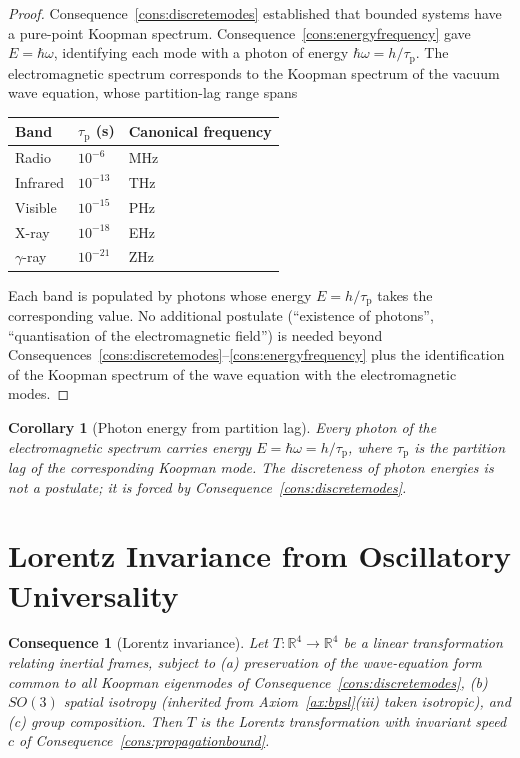 \documentclass[11pt,twocolumn,a4paper]{article}
\theoremstyle{axiomstyle}
\theoremstyle{conseqstyle}
\newtheorem{consequence}{Consequence}
\newtheorem{corollary}{Corollary}
\theoremstyle{definition}
\theoremstyle{remark}
\newcommand{\Real}{\mathbb{R}}
\newcommand{\taup}{\tau_{\mathrm{p}}}
\begin{document}
\begin{proof}
Consequence~\ref{cons:discretemodes} established that bounded systems have a pure-point Koopman spectrum. Consequence~\ref{cons:energyfrequency} gave $E=\hbar\omega$, identifying each mode with a photon of energy $\hbar\omega=h/\taup$. The electromagnetic spectrum corresponds to the Koopman spectrum of the vacuum wave equation, whose partition-lag range spans
\begin{center}
\begin{tabular}{lll}
\toprule
Band & $\taup$ (s) & Canonical frequency \\
\midrule
Radio       & $10^{-6}$  & MHz \\
Infrared    & $10^{-13}$ & THz \\
Visible     & $10^{-15}$ & PHz \\
X-ray       & $10^{-18}$ & EHz \\
$\gamma$-ray & $10^{-21}$ & ZHz \\
\bottomrule
\end{tabular}
\end{center}
Each band is populated by photons whose energy $E=h/\taup$ takes the corresponding value. No additional postulate (``existence of photons'', ``quantisation of the electromagnetic field'') is needed beyond Consequences~\ref{cons:discretemodes}--\ref{cons:energyfrequency} plus the identification of the Koopman spectrum of the wave equation with the electromagnetic modes.
\end{proof}

\begin{corollary}[Photon energy from partition lag]\label{cor:photontaup}
Every photon of the electromagnetic spectrum carries energy $E=\hbar\omega=h/\taup$, where $\taup$ is the partition lag of the corresponding Koopman mode. The discreteness of photon energies is not a postulate; it is forced by Consequence~\ref{cons:discretemodes}.
\end{corollary}

\section{Lorentz Invariance from Oscillatory Universality}
\label{sec:lorentz}

\begin{consequence}[Lorentz invariance]
\label{cons:lorentz}
Let $T\colon\Real^{4}\to\Real^{4}$ be a linear transformation relating inertial frames, subject to (a) preservation of the wave-equation form common to all Koopman eigenmodes of Consequence~\ref{cons:discretemodes}, (b) $SO(3)$ spatial isotropy (inherited from Axiom~\ref{ax:bpsl}(iii) taken isotropic), and (c) group composition. Then $T$ is the Lorentz transformation with invariant speed $c$ of Consequence~\ref{cons:propagationbound}.
\end{consequence}
\end{document}

